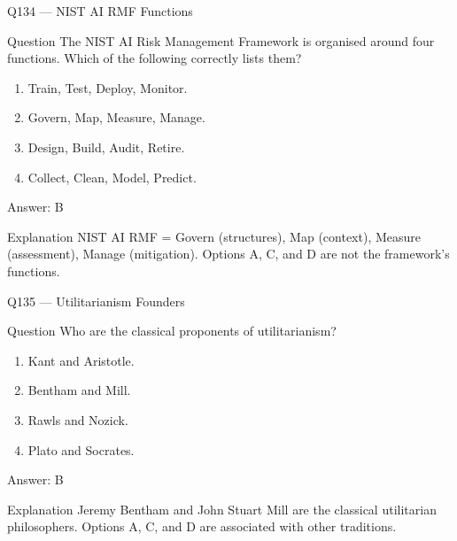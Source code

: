 \documentclass[aspectratio=169,8pt]{beamer}
\begin{document}
\begin{frame}{Q134 --- NIST AI RMF Functions}
\begin{block}{Question}
The NIST AI Risk Management Framework is organised around four functions. Which of the following correctly lists them?
\begin{enumerate}
\item Train, Test, Deploy, Monitor.
\item Govern, Map, Measure, Manage.
\item Design, Build, Audit, Retire.
\item Collect, Clean, Model, Predict.
\end{enumerate}
	\end{block}
\begin{exampleblock}{Answer: B}\end{exampleblock}
\begin{block}{Explanation}
NIST AI RMF = Govern (structures), Map (context), Measure (assessment), Manage (mitigation). Options A, C, and D are not the framework's functions.
\end{block}
\end{frame}

\begin{frame}{Q135 --- Utilitarianism Founders}
\begin{block}{Question}
Who are the classical proponents of utilitarianism?
\begin{enumerate}
\item Kant and Aristotle.
\item Bentham and Mill.
\item Rawls and Nozick.
\item Plato and Socrates.
\end{enumerate}
	\end{block}
\begin{exampleblock}{Answer: B}\end{exampleblock}
\begin{block}{Explanation}
Jeremy Bentham and John Stuart Mill are the classical utilitarian philosophers. Options A, C, and D are associated with other traditions.
\end{block}
\end{frame}
\end{document}
